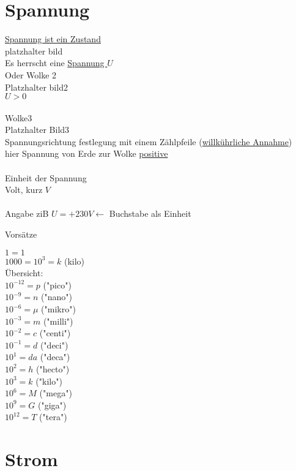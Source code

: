\section{Spannung}
\underline{Spannung ist ein Zustand}\\
platzhalter bild\\
Es herrscht eine \underline{Spannung $U$}\\
Oder Wolke 2\\
Platzhalter bild2\\
$ U > 0 $\\
\\

Wolke3\\
Platzhalter Bild3\\

Spannungsrichtung festlegung mit einem Zählpfeile (\underline{willkührliche Annahme})\\
hier Spannung von Erde zur Wolke \underline{positive}\\
\\
Einheit der Spannung\\
Volt, kurz $V$\\
\\
Angabe ziB $U = + 230 V \leftarrow $ Buchstabe als Einheit\\

\newpage

Vorsätze

$ 1 =1 $\\
$ 1000 = 10^3 = k $ (kilo)\\
Übersicht:\\
$ 10^{-12} = p $ ("pico")\\
$ 10^{-9} = n $ ("nano")\\
$ 10^{-6} = \mu $ ("mikro")\\
$ 10^{-3} = m $ ("milli")\\
$ 10^{-2} = c $ ("centi")\\
$ 10^{-1} = d $ ("deci")\\
$ 10^{1} = da $ ("deca")\\
$ 10^{2} = h $ ("hecto")\\
$ 10^{3} = k $ ("kilo")\\
$ 10^{6} = M $ ("mega")\\
$ 10^{9} = G $ ("giga")\\
$ 10^{12} = T $ ("tera")\\


\section{Strom}

